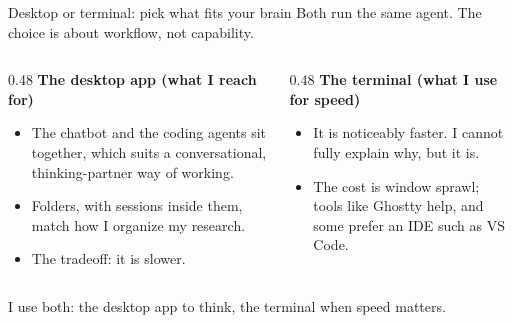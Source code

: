 \documentclass[aspectratio=169,11pt]{beamer}
\begin{document}
\begin{frame}{Desktop or terminal: pick what fits your brain}
Both run the same agent. The choice is about workflow, not capability.
\vspace{0.3cm}
\begin{columns}[T]
\begin{column}{0.48\textwidth}
\textbf{The desktop app (what I reach for)}
\begin{itemize}\setlength\itemsep{0.25em}
    \item The chatbot and the coding agents sit together, which suits a conversational, thinking-partner way of working.
    \item Folders, with sessions inside them, match how I organize my research.
    \item The tradeoff: it is slower.
\end{itemize}
\end{column}
\begin{column}{0.48\textwidth}
\textbf{The terminal (what I use for speed)}
\begin{itemize}\setlength\itemsep{0.25em}
    \item It is noticeably faster. I cannot fully explain why, but it is.
    \item The cost is window sprawl; tools like Ghostty help, and some prefer an IDE such as VS Code.
\end{itemize}
\end{column}
\end{columns}
\vspace{0.35cm}
\alert{I use both: the desktop app to think, the terminal when speed matters.}
\end{frame}
\end{document}
